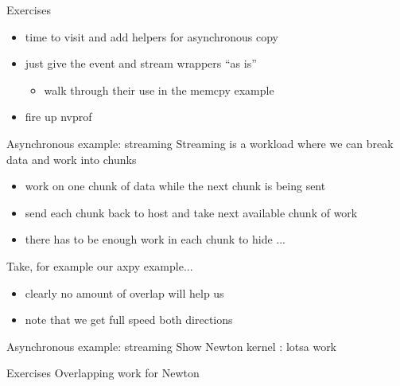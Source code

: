 \begin{frame}[fragile]{Exercises}
    \begin{itemize}
        \item time to visit  and add helpers for asynchronous copy
        \item just give the event and stream wrappers ``as is''
        \begin{itemize}
            \item walk through their use in the memcpy example
        \end{itemize}
        \item fire up nvprof
    \end{itemize}
\end{frame}

\begin{frame}[fragile]{Asynchronous example: streaming}
    Streaming is a workload where we can break data and work into chunks
    \begin{itemize}
        \item work on one chunk of data while the next chunk is being sent
        \item send each chunk back to host and take next available chunk of work
        \item there has to be enough work in each chunk to hide ...
    \end{itemize}

    Take, for example our axpy example...
    \begin{itemize}
        \item clearly no amount of overlap will help us
        \item note that we get full speed both directions
    \end{itemize}
\end{frame}

\begin{frame}[fragile]{Asynchronous example: streaming}
    Show Newton kernel : lotsa work
\end{frame}

\begin{frame}[fragile]{Exercises}
    Overlapping work for Newton
\end{frame}
